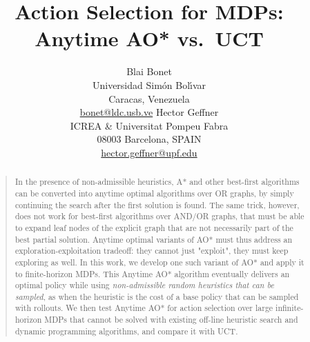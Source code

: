 \documentclass[letterpaper]{article}
\begin{document}
%
\title{Action Selection for MDPs: Anytime AO* vs.\ UCT}

\author{Blai Bonet \\
        Universidad Sim\'on Bol\'{\i}var \\
        Caracas, Venezuela \\
        {\normalsize\url{bonet@ldc.usb.ve}}
\And
        Hector Geffner \\
        ICREA \&  Universitat Pompeu Fabra \\
        08003  Barcelona, SPAIN \\
        {\normalsize\url{hector.geffner@upf.edu}}}


\maketitle
\begin{abstract}
\begin{quote}
In the presence of non-admissible heuristics, A* and other best-first algorithms 
can be  converted into anytime optimal algorithms over OR graphs, by simply continuing
the search after the first solution is found. The same trick, however, does not work 
for  best-first algorithms over AND/OR graphs, that must be able to expand leaf nodes of 
the explicit graph that are not necessarily part of the best partial solution.
Anytime optimal variants of AO* must thus address an exploration-exploitation tradeoff: 
they cannot just "exploit", they must keep exploring as well. In this work,  
we develop one such variant of AO* and apply it to finite-horizon MDPs.  
This Anytime AO* algorithm eventually delivers an optimal policy  while using
\emph{non-admissible random heuristics that can be sampled}, as when the heuristic
is the cost of a base policy that can be sampled with rollouts.
We then test Anytime AO* for action selection
over large infinite-horizon MDPs that cannot be solved with existing off-line
heuristic search and dynamic programming algorithms, and compare it with UCT.
\end{quote}
\end{abstract}
\end{document}
